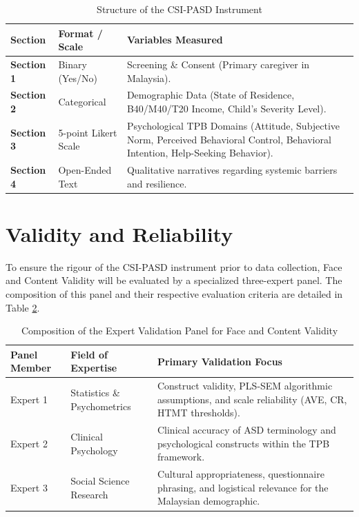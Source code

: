 \begin{table}[H]
    \centering
    \linespread{1.5}\selectfont
    \caption{Structure of the CSI-PASD Instrument}
    \vspace{0.2cm}
    \begin{tabular}{llp{6.5cm}}
        \toprule
        \textbf{Section} & \textbf{Format / Scale} & \textbf{Variables Measured} \\
        \midrule
        \textbf{Section 1} & Binary (Yes/No) & Screening \& Consent (Primary caregiver in Malaysia). \\
        \addlinespace
        \textbf{Section 2} & Categorical & Demographic Data (State of Residence, B40/M40/T20 Income, Child's Severity Level). \\
        \addlinespace
        \textbf{Section 3} & 5-point Likert Scale & Psychological TPB Domains (Attitude, Subjective Norm, Perceived Behavioral Control, Behavioral Intention, Help-Seeking Behavior). \\
        \addlinespace
        \textbf{Section 4} & Open-Ended Text & Qualitative narratives regarding systemic barriers and resilience. \\
        \bottomrule
    \end{tabular}
    \label{tab:instrument}
\end{table}

\section{Validity and Reliability}
To ensure the rigour of the CSI-PASD instrument prior to data collection, Face and Content Validity will be evaluated by a specialized three-expert panel. The composition of this panel and their respective evaluation criteria are detailed in Table \ref{tab:expert_panel}.

\begin{table}[H]
    \centering
    \linespread{1.5}\selectfont
    \caption{Composition of the Expert Validation Panel for Face and Content Validity}
    \vspace{0.2cm}
    \begin{tabular}{llp{7cm}}
        \toprule
        \textbf{Panel Member} & \textbf{Field of Expertise} & \textbf{Primary Validation Focus} \\
        \midrule
        Expert 1 & Statistics \& Psychometrics & Construct validity, PLS-SEM algorithmic assumptions, and scale reliability (AVE, CR, HTMT thresholds). \\
        \addlinespace
        Expert 2 & Clinical Psychology & Clinical accuracy of ASD terminology and psychological constructs within the TPB framework. \\
        \addlinespace
        Expert 3 & Social Science Research & Cultural appropriateness, questionnaire phrasing, and logistical relevance for the Malaysian demographic. \\
        \bottomrule
    \end{tabular}
    \label{tab:expert_panel}
\end{table}

